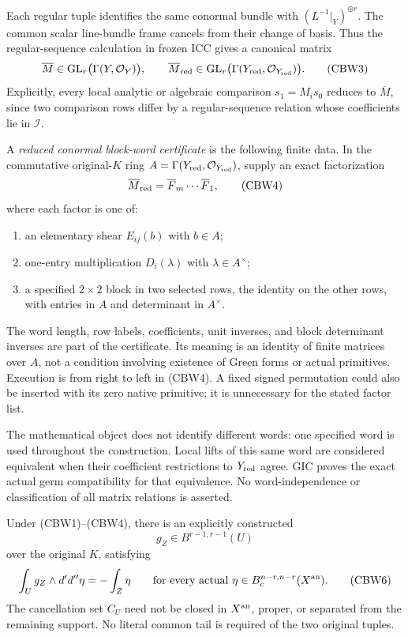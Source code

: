Each regular tuple identifies the same conormal bundle with
$(L^{-1}|_Y)^{\oplus r}$.  The common scalar line-bundle frame
cancels from their change of basis.  Thus the regular-sequence
calculation in frozen ICC gives a canonical matrix
\[
 \overline M\in\operatorname{GL}_r\bigl(\Gamma(Y,\mathcal O_Y)\bigr),
 \qquad
 \overline M_{\rm red}
   \in\operatorname{GL}_r\bigl(\Gamma(Y_{\rm red},\mathcal O_{Y_{\rm red}})\bigr).
 \tag{CBW3}
\]
Explicitly, every local analytic or algebraic comparison $s_1=M_i s_0$
reduces to $\overline M$, since two comparison rows differ by a
regular-sequence relation whose coefficients lie in $\mathcal I$.

A \emph{reduced conormal block-word certificate} is the following
finite data.  In the commutative original-$K$ ring
$A=\Gamma(Y_{\rm red},\mathcal O_{Y_{\rm red}})$, supply an exact
factorization
\[
                 \overline M_{\rm red}
                           =\overline F_m\cdots\overline F_1,
 \tag{CBW4}
\]
where each factor is one of:
\begin{enumerate}
\item an elementary shear $E_{ij}(b)$ with $b\in A$;
\item one-entry multiplication $D_i(\lambda)$ with $\lambda\in A^\times$;
\item a specified $2\times2$ block in two selected rows, the identity
on the other rows, with entries in $A$ and determinant in $A^\times$.
\end{enumerate}
The word length, row labels, coefficients, unit inverses, and block
determinant inverses are part of the certificate.  Its meaning is an
identity of finite matrices over $A$, not a condition involving
existence of Green forms or actual primitives.  Execution is from
right to left in (CBW4).  A fixed signed permutation could also be
inserted with its zero native primitive; it is unnecessary for the
stated factor list.

The mathematical object does not identify different words: one
specified word is used throughout the construction.  Local lifts
of this same word are considered equivalent when their coefficient
restrictions to $Y_{\rm red}$ agree.  GIC proves the exact actual
germ compatibility for that equivalence.  No word-independence or
classification of all matrix relations is asserted.

\begin{theorem}
Under (CBW1)--(CBW4), there is an explicitly constructed
\[
                         g_Z\in B^{r-1,r-1}(U)
 \tag{CBW5}
\]
over the original $K$, satisfying
\[
 \int_U g_Z\wedge d'd''\eta=-\int_Z\eta
      \qquad\text{for every actual }
      \eta\in B_c^{n-r,n-r}(X^{\rm an}).
 \tag{CBW6}
\]
The cancellation set $C_U$ need not be closed in $X^{\rm an}$,
proper, or separated from the remaining support.  No literal
common tail is required of the two original tuples.
\end{theorem}

